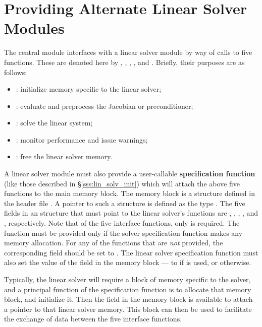 \chapter{Providing Alternate Linear Solver Modules}\label{s:new_linsolv}
The central {\idas} module interfaces with a linear solver module 
by way of calls to five functions.  These are denoted here by 
, , , , and .
Briefly, their purposes are as follows:
\begin{itemize}
\item {}: initialize memory specific to the linear solver;
\item {}: evaluate and preprocess the Jacobian or preconditioner;
\item {}: solve the linear system;
\item {}: monitor performance and issue warnings;
\item {}: free the linear solver memory.
\end{itemize}
A linear solver module must also provide a user-callable {\bf specification function}
(like those described in \S\ref{sss:lin_solv_init}) which will attach
the above five functions to the main {\idas} memory block. 
The {\idas} memory block is a structure defined in the header file . 
A pointer to such a structure is defined as the type . 
The five fields in an  structure that must point to the linear solver's 
functions are , , , , 
and , respectively.
Note that of the five interface functions, only  is required. 
The  function must be provided only if the solver specification function
makes any memory allocation.   For any of the functions that are
{\it not} provided, the corresponding field should be set to .
The linear solver specification function must also set the value of
the field  in the {\idas} memory block --- to
 if  is used, or  otherwise.

Typically, the linear solver will require a block of memory specific
to the solver, and a principal function of the specification function
is to allocate that memory block, and initialize it.  Then the field
 in the {\idas} memory block is available to attach a
pointer to that linear solver memory.  This block can then be used
to facilitate the exchange of data between the five interface
functions.

